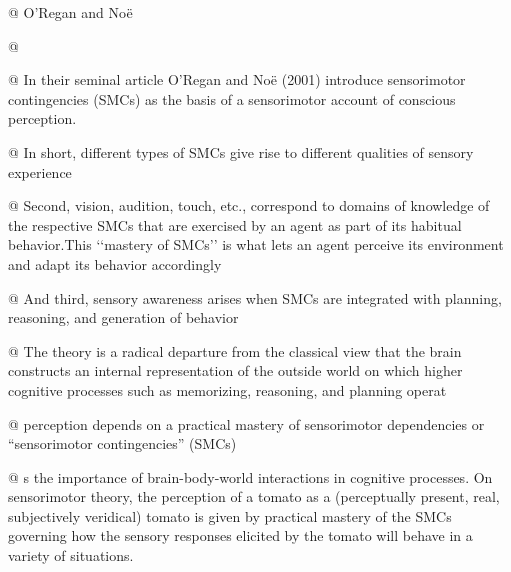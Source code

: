 \documentclass[utf8]{article}
\begin{document}
		\begin{WritingMaterials}

			@ O’Regan and Noë


			@ 

			@ In their seminal article O’Regan and Noë (2001) introduce sensorimotor contingencies (SMCs) as the basis of a sensorimotor account of conscious perception.

			@ In short, different types of SMCs give rise to different qualities of sensory experience

			@  Second, vision, audition, touch, etc., correspond to domains of knowledge of the respective SMCs that are exercised by an agent as part of its habitual behavior.This ‘‘mastery of SMCs’’ is what lets an agent perceive its environment and adapt its behavior accordingly

			@ And third, sensory awareness arises when SMCs are integrated with planning, reasoning, and generation of behavior

			@ The theory is a radical departure from the classical view that the brain constructs an internal representation of the outside world on which higher cognitive processes such as memorizing, reasoning, and planning operat

			@ perception depends on a practical mastery of sensorimotor dependencies or “sensorimotor contingencies” (SMCs)

			@ s the importance of brain-body-world interactions in cognitive processes. On sensorimotor theory, the perception of a tomato as a (perceptually present, real, subjectively veridical) tomato is given by practical mastery of the SMCs governing how the sensory responses elicited by the tomato will behave in a variety of situations.


\end{WritingMaterials}
\end{document}
